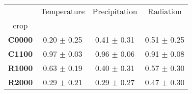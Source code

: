 \begin{tabular}{|c|c|c|c|}
\toprule
 & Temperature & Precipitation & Radiation \\
crop &  &  &  \\
\midrule
\textbf{C0000} & 0.20 $\pm$ 0.25 & 0.41 $\pm$ 0.31 & 0.51 $\pm$ 0.25 \\
\textbf{C1100} & 0.97 $\pm$ 0.03 & 0.96 $\pm$ 0.06 & 0.91 $\pm$ 0.08 \\
\textbf{R1000} & 0.63 $\pm$ 0.19 & 0.40 $\pm$ 0.31 & 0.57 $\pm$ 0.30 \\
\textbf{R2000} & 0.29 $\pm$ 0.21 & 0.29 $\pm$ 0.27 & 0.47 $\pm$ 0.30 \\
\bottomrule
\end{tabular}
